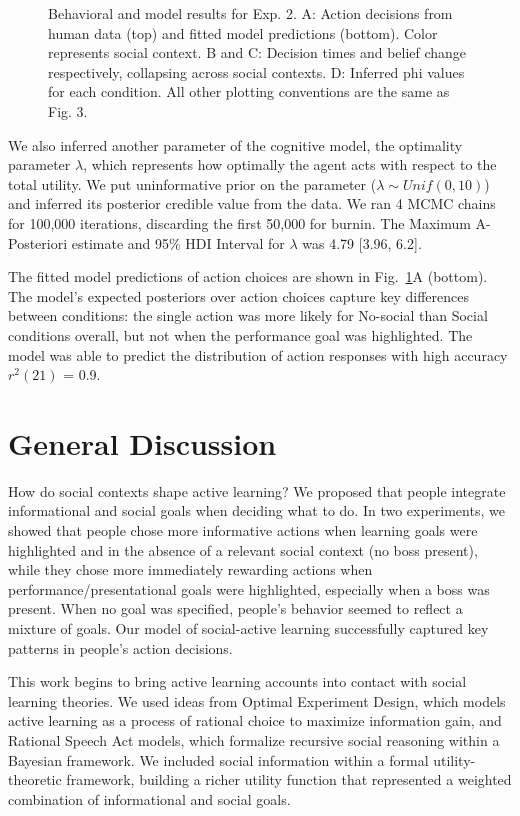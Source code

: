 \documentclass[10pt, letterpaper]{article}
\newenvironment{CodeChunk}{}{}
\begin{document}
\begin{CodeChunk}
\begin{figure}[H]
{}

\caption[Behavioral and model results for Exp]{Behavioral and model results for Exp. 2. A: Action decisions from human data (top) and fitted model predictions (bottom). Color represents social context. B and C: Decision times and belief change respectively, collapsing across social contexts. D: Inferred phi values for each condition. All other plotting conventions are the same as Fig. 3.}\label{fig:e2_results}
\end{figure}
\end{CodeChunk}

We also inferred another parameter of the cognitive model, the
optimality parameter \(\lambda\), which represents how optimally the
agent acts with respect to the total utility. We put uninformative prior
on the parameter (\(\lambda \sim Unif(0,10)\)) and inferred its
posterior credible value from the data. We ran 4 MCMC chains for 100,000
iterations, discarding the first 50,000 for burnin. The Maximum A-
Posteriori estimate and 95\% HDI Interval for \(\lambda\) was 4.79
{[}3.96, 6.2{]}.

The fitted model predictions of action choices are shown in
Fig.~\ref{fig:e2_results}A (bottom). The model's expected posteriors
over action choices capture key differences between conditions: the
single action was more likely for No-social than Social conditions
overall, but not when the performance goal was highlighted. The model
was able to predict the distribution of action responses with high
accuracy \(r^2(21)\) = 0.9.

\hypertarget{general-discussion}{%
\section{General Discussion}\label{general-discussion}}

How do social contexts shape active learning? We proposed that people
integrate informational and social goals when deciding what to do. In
two experiments, we showed that people chose more informative actions
when learning goals were highlighted and in the absence of a relevant
social context (no boss present), while they chose more immediately
rewarding actions when performance/presentational goals were
highlighted, especially when a boss was present. When no goal was
specified, people's behavior seemed to reflect a mixture of goals. Our
model of social-active learning successfully captured key patterns in
people's action decisions.

This work begins to bring active learning accounts into contact with
social learning theories. We used ideas from Optimal Experiment Design,
which models active learning as a process of rational choice to maximize
information gain, and Rational Speech Act models, which formalize
recursive social reasoning within a Bayesian framework. We included
social information within a formal utility-theoretic framework, building
a richer utility function that represented a weighted combination of
informational and social goals.
\end{document}
